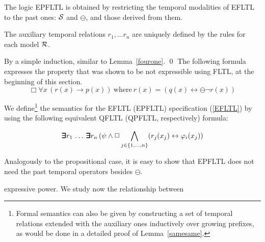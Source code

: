 The logic EPFLTL is obtained by restricting the temporal modalities of EFLTL to the past ones:
${\cal S}$ and $\ominus$, and those derived from them.

\begin{lemma} \label{samesame}
The auxiliary temporal relations $r_1, \ldots r_n$ are
uniquely defined by the rules for each model ${\cal R}$.
\end{lemma}
 By a simple induction, similar to Lemma~\ref{fourone}. \qed
\vspace{1ex}
The following formula expresses the property that was shown to be 
not expressible using FLTL, at the beginning of this section.
\begin{equation}
\Box \forall x \, (r(x)\rightarrow p(x)) \mathrm{\ where\ }
r(x) = ( q(x) \leftrightarrow \ominus \neg  r(x)) 
\label{eq:wolper-first-order}
\end{equation}

\noindent
We define\footnote{ Formal semantics 
can also be given by constructing a set of temporal relations extended
with the auxiliary ones
inductively over growing prefixes, as would be done in a detailed proof of Lemma~\ref{samesame}.} the semantics for the EFLTL (EPFLTL)
specification (\ref{EFLTL}) 
by using the following equivalent
QFLTL (QPFLTL, respectively) formula:

\begin{equation} \label{equiv}
\bm{\exists}\kern-0.6em\bm{\exists} r_1  \, \ldots \, \bm{\exists}\kern-0.6em\bm{\exists} r_n \,  ( \psi \wedge \Box \bigwedge_{j \in \{ 1, \ldots , n\}} (r_j ( x_j )  \leftrightarrow 
\varphi_i ( x_j) )
\end{equation}

\noindent 
Analogously to the propositional case, it is easy to show that EPFLTL does not
need the past temporal operators besides $\ominus$.




expressive power. We study now the relationship between

